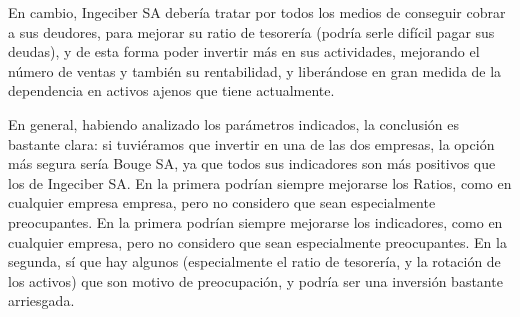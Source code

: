 \documentclass[a4paper]{article}
\begin{document}
En cambio, Ingeciber SA debería tratar por todos los medios de conseguir cobrar a sus deudores, para mejorar su ratio de tesorería (podría serle difícil pagar sus deudas), y de esta forma poder invertir más en sus actividades, mejorando el número de ventas y también su rentabilidad, y liberándose en gran medida de la dependencia en activos ajenos que tiene actualmente.

En general, habiendo analizado los parámetros indicados, la conclusión es bastante clara: si tuviéramos que invertir en una de las dos empresas, la opción más segura sería Bouge SA, ya que todos sus indicadores son más positivos que los de Ingeciber SA. En la primera podrían siempre mejorarse los Ratios, como en cualquier empresa empresa, pero no considero que sean especialmente preocupantes. En la primera podrían siempre mejorarse los indicadores, como en cualquier empresa, pero no considero que sean especialmente preocupantes. En la segunda, sí que hay algunos (especialmente el ratio de tesorería, y la rotación de los activos) que son motivo de preocupación, y podría ser una inversión bastante arriesgada.
\end{document}
